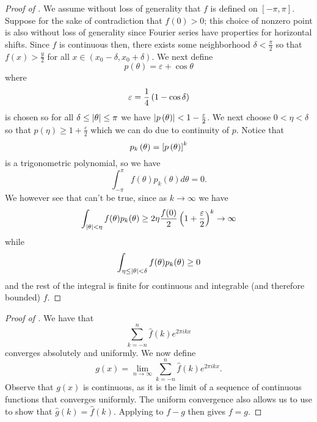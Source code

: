\documentclass{article}
\begin{document}
\begin{proof}[Proof of ]
	We assume without loss of generality that $f$ is defined on $[-\pi, \pi]$.
	Suppose for the sake of contradiction that $f(0)>0$; this choice of nonzero point is also without loss of generality since Fourier series have properties for horizontal shifts.
	Since $f$ is continuous then, there exists some neighborhood $\delta<\frac{\pi}{2}$ so that $f(x)>\frac{y}{2}$ for all $x\in(x_0 - \delta, x_0 + \delta)$.
	We next define
	\begin{equation}
		p(\theta)=\varepsilon+\cos\theta
	\end{equation}
	where
	$$\varepsilon=\frac{1}{4}\left(1-\cos\delta\right)$$
	is chosen so for all $\delta\leq\abs{\theta}\leq\pi$ we have $\abs{p\left(\theta\right)}<1-\frac{\varepsilon}{2}$.
	We next choose $0<\eta<\delta$ so that $p(\eta)\geq 1 +\frac{\varepsilon}{2}$ which we can do due to continuity of $p$.
	Notice that
	$$p_k\left(\theta\right)=\left[p\left(\theta\right)\right]^k$$
	is a trigonometric polynomial, so we have
	\begin{equation*}
		\int_{-\pi}^\pi f(\theta) p_k(\theta)d\theta = 0.
	\end{equation*}
	We however see that can't be true, since as $k\rightarrow\infty$ we have
	\begin{equation*}
		\int_{\abs{\theta}<\eta}f(\theta)p_k(\theta)\geq 2\eta\frac{f(0)}{2}\left(1+\frac{\varepsilon}{2}\right)^k\rightarrow\infty
	\end{equation*}
	while
	\begin{equation*}
		\int_{\eta\leq\abs{\theta}<\delta}f(\theta)p_k(\theta)\geq 0
	\end{equation*}
	and the rest of the integral is finite for continuous and integrable (and therefore bounded) $f$.
\end{proof}

\begin{proof}[Proof of ]
	We have that
	\begin{equation}
		\sum_{k=-n}^n \hat{f}(k) e^{2\pi i k x}
	\end{equation}
	converges absolutely and uniformly.
	We now define
	\begin{equation}
		g(x)=\lim_{n\rightarrow\infty}\sum_{k=-n}^n \hat{f}(k) e^{2\pi i k x}.
	\end{equation}
	Observe that $g(x)$ is continuous, as it is the limit of a sequence of continuous functions that converges uniformly.
	The uniform convergence also allows us to use  to show that $\hat{g}(k)=\hat{f}(k)$.
	Applying  to $f-g$ then gives $f=g$.
\end{proof}
\end{document}
